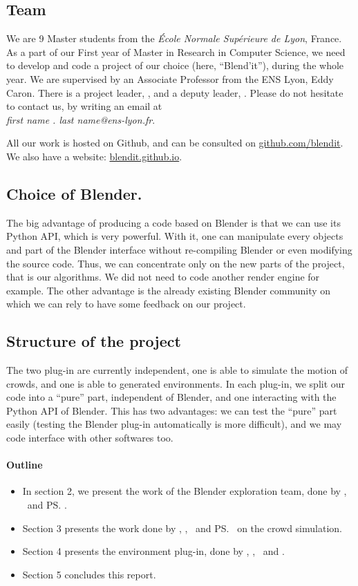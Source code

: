 \subsection{Team}

We are 9 Master students from the \textit{École Normale Supérieure de
Lyon}, France. As a part of our First year of Master in Research in
Computer Science, we need to develop and code a project of our choice
(here, ``Blend'it''), during the whole year. We are supervised by an
Associate Professor from the ENS Lyon, Eddy Caron. There is a project
leader, \me, and a deputy leader, \mr. Please do not hesitate to
contact us, by writing an email at \\
\textit{first name . last name@ens-lyon.fr}.


All our work is hosted on Github, and can be consulted on
\url{github.com/blendit}. We also have a website:
\url{blendit.github.io}.


\subsection{Choice of Blender.}

The big advantage of producing a code based on Blender is that we can
use its Python API, which is very powerful. With it, one can
manipulate every objects and part of the Blender interface without
re-compiling Blender or even modifying the source code. Thus, we can
concentrate only on the new parts of the project, that is our algorithms. We
did not need to code another render engine for example.  The other
advantage is the already existing Blender community on which
we can rely to have some feedback on our project.


\subsection{Structure of the project}

The two plug-in are currently independent, one is able to simulate the
motion of crowds, and one is able to generated environments. In each
plug-in, we split our code into a ``pure'' part, independent of
Blender, and one interacting with the Python API of Blender. This has
two advantages: we can test the ``pure'' part easily (testing the
Blender plug-in automatically is more difficult), and we may code
interface with other softwares too.



\paragraph{Outline}

\begin{itemize}
  \item In section 2, we present the work of the Blender exploration team, done by \mr, \me\ and \ps.
  \item Section 3 presents the work done by \dl, \vl,
\js\ and \ps \ on the crowd simulation.
 \item Section 4 presents the environment
plug-in, done by \bb, \gc, \mr\ and \me.
\item Section 5 concludes this report.
\end{itemize}

  
